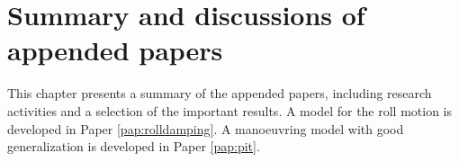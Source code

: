 \chapter{Summary and discussions of appended papers \label{ch:results}}
This chapter presents a summary of the appended papers, including research activities and a selection of the important results. A model for the roll motion is developed in Paper \ref{pap:rolldamping}. A manoeuvring model with good generalization is developed in Paper \ref{pap:pit}.



%





